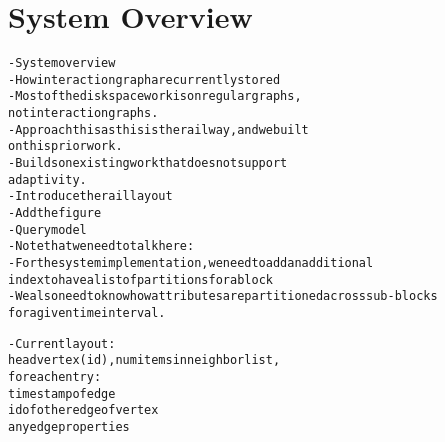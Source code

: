 \section{System Overview}\label{sec:system}
\begin{alltt}\scriptsize
- System overview
    - How interaction graph are currently stored
        - Most of the disk space work is on regular graphs, 
           not interaction graphs. 
        - Approach this as this is the railway, and we built
           on this prior work.
        - Builds on existing work that does not support 
          adaptivity.
    - Introduce the rail layout
    - Add the figure
    - Query model
   - Note that we need to talk here:
    - For the system implementation, we need to add an additional
       index to have a list of partitions for a block
   - We also need to know how attributes are partitioned across sub-blocks 
      for a given time interval.

    - Current layout:
    head vertex (id), num items in neighbor list, 
    for each entry:
        timestamp of edge
        id of other edge of vertex
        any edge properties

\end{alltt}
